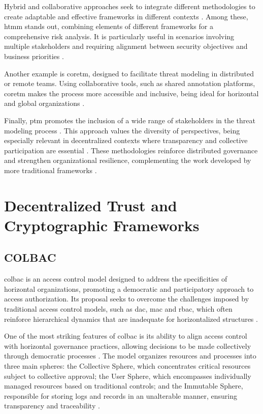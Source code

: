 Hybrid and collaborative approaches seek to integrate different methodologies to
create adaptable and effective frameworks in different contexts
\cite{AHybridThreatModelingMethod, CoReTM}. Among these, \gls{htmm} stands out,
combining elements of different frameworks for a comprehensive risk analysis. It
is particularly useful in scenarios involving multiple stakeholders and
requiring alignment between security objectives and business priorities
\cite{AHybridThreatModelingMethod}.

Another example is \gls{coretm}, designed to facilitate threat modeling in
distributed or remote teams. Using collaborative tools, such as shared
annotation platforms, \gls{coretm} makes the process more accessible and
inclusive, being ideal for horizontal and global organizations \cite{CoReTM}.

Finally, \gls{ptm} promotes the inclusion of a wide range of stakeholders in the
threat modeling process \cite{ParticipatoryThreatModelling}. This approach
values the diversity of perspectives, being especially relevant in
decentralized contexts where transparency and collective participation are
essential \cite{ParticipatoryThreatModelling}. These methodologies reinforce
distributed governance and strengthen organizational resilience, complementing
the work developed by more traditional frameworks \cite{Colbac}.

\section{Decentralized Trust and Cryptographic Frameworks}
\label{sec:decentralized_trust_crypto_frameworks}

\subsection{COLBAC}
\label{subsec:colbac}

\gls{colbac} is an access control model designed to address the specificities of
horizontal organizations, promoting a democratic and participatory approach to
access authorization. Its proposal seeks to overcome the challenges imposed by
traditional access control models, such as \gls{dac}, \gls{mac} and \gls{rbac},
which often reinforce hierarchical dynamics that are inadequate for
horizontalized structures \cite{Colbac}.

One of the most striking features of \gls{colbac} is its ability to align access
control with horizontal governance practices, allowing decisions to be made
collectively through democratic processes \cite{ParticipatoryThreatModelling}.
The model organizes resources and processes into three main spheres: the
Collective Sphere, which concentrates critical resources subject to collective
approval; the User Sphere, which encompasses individually managed resources
based on traditional controls; and the Immutable Sphere, responsible for storing
logs and records in an unalterable manner, ensuring transparency and
traceability \cite{Colbac}.

